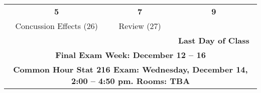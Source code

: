 \documentclass[11pt]{article}
\begin{document}
\begin{center}
\begin{tabular}{|c|c|c|}
  \hfill\bf{5} & \bf{7} & \hfill\bf{9} \\
  Concussion Effects \small{(26)}
  & Review    \small{(27)}&  \\
  &  &  \small\bf{ Last Day of Class}  \\ \hline

  \multicolumn{3}{|c|}{\textbf{Final Exam Week: December 12 -- 16 }} \\
  \multicolumn{3}{|c|}{\bf{ Common Hour Stat 216  Exam: 
      Wednesday, December 14, 2:00 -- 4:50 pm. Rooms: TBA}} \\
\hline

\end{tabular}
\vspace{.2in} \\
\end{center}
 
\end{document}
